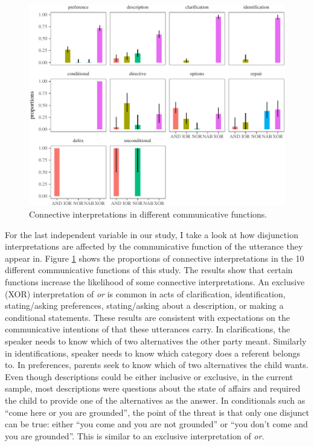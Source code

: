 \documentclass[oneside]{report}
\theoremstyle{definition}
\theoremstyle{definition}
\theoremstyle{definition}
\theoremstyle{remark}
\begin{document}
\begin{figure}[tb]

{\centering \includegraphics{figs/speechActPlot-1} 

}

\caption{Connective interpretations in different communicative functions.}\label{fig:speechActPlot}
\end{figure}
For the last independent variable in our study, I take a look at how
disjunction interpretations are affected by the communicative function
of the utterance they appear in. Figure \ref{fig:speechActPlot} shows
the proportions of connective interpretations in the 10 different
communicative functions of this study. The results show that certain
functions increase the likelihood of some connective interpretations. An
exclusive (XOR) interpretation of \emph{or} is common in acts of
clarification, identification, stating/asking preferences,
stating/asking about a description, or making a conditional statements.
These results are consistent with expectations on the communicative
intentions of that these utterances carry. In clarifications, the
speaker needs to know which of two alternatives the other party meant.
Similarly in identifications, speaker needs to know which category does
a referent belongs to. In preferences, parents seek to know which of two
alternatives the child wants. Even though descriptions could be either
inclusive or exclusive, in the current sample, most descriptions were
questions about the state of affairs and required the child to provide
one of the alternatives as the answer. In conditionals such as ``come
here or you are grounded'', the point of the threat is that only one
disjunct can be true: either ``you come and you are not grounded'' or
``you don't come and you are grounded''. This is similar to an exclusive
interpretation of \emph{or}.
\end{document}
